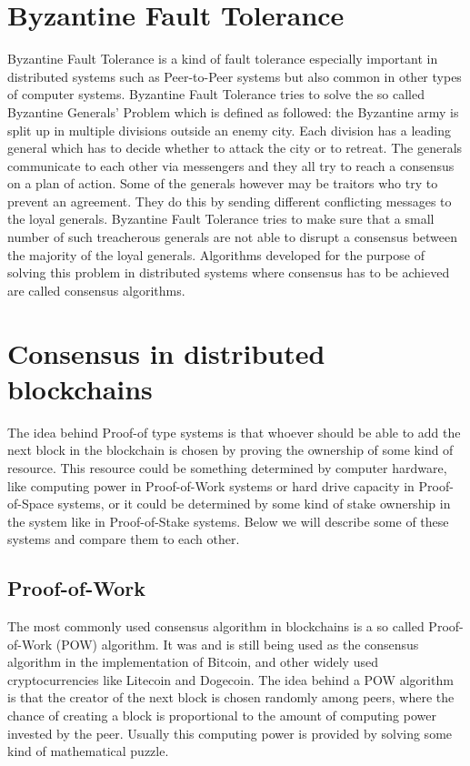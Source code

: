\section{Byzantine Fault Tolerance}

Byzantine Fault Tolerance is a kind of fault tolerance especially important in distributed systems such as Peer-to-Peer systems but also common in other types of computer systems.
Byzantine Fault Tolerance tries to solve the so called Byzantine Generals' Problem which is defined as followed: the Byzantine army is split up in multiple divisions 
outside an enemy city. Each division has a leading general which has to decide whether to attack the city or to retreat. The generals communicate to each other via messengers and they all try to
reach a consensus on a plan of action. Some of the generals however may be traitors who try to prevent an agreement. They do this by sending different conflicting messages to the loyal generals. 
Byzantine Fault Tolerance tries to make sure that a small number of such treacherous generals are not able to disrupt a consensus between the majority of the loyal generals.\cite{url:byzantine_general}
Algorithms developed for the purpose of solving this problem in distributed systems where consensus has to be achieved are called consensus algorithms.

\section{Consensus in distributed \\
blockchains}

The idea behind Proof-of type systems is that whoever should be able to add the next block in the blockchain is chosen by proving the ownership of some kind of resource. This resource could be
something determined by computer hardware, like computing power in Proof-of-Work systems or hard drive capacity in Proof-of-Space systems, or it could be determined by some kind of stake ownership
in the system like in Proof-of-Stake systems. Below we will describe some of these systems and compare them to each other.

\subsection{Proof-of-Work}

The most commonly used consensus algorithm in blockchains is a so called Proof-of-Work (POW) algorithm. It was and is still being used as the consensus algorithm in the implementation of Bitcoin,\cite{url:bitcoin}
and other widely used cryptocurrencies like Litecoin and Dogecoin.
The idea behind a POW algorithm is that the creator of the next block is chosen randomly among peers, where the chance of creating a block is proportional to the amount of computing power invested
by the peer. Usually this computing power is provided by solving some kind of mathematical puzzle.

